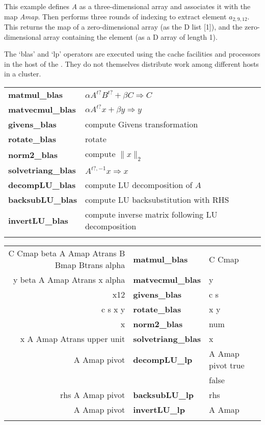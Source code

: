 \noindent This example defines \emph{A} as a three-dimensional array and associates it with the map \emph{Amap}. Then performs three rounds of indexing to extract element $a_{2,9,12}$. This returns the map of a zero-dimensional array (as the D list [1]), and the zero-dimensional array containing the element (as a D array of length 1).

The `blas' and `lp' operators are executed using the cache facilities and processors in the host of the . They do not themselves distribute work among different hosts in a cluster.\\

\begin{tabular}{>{\sffamily\bfseries}l>{\sffamily}l}
matmul\_blas & $\alpha A^{t?} B^{t?} + \beta C \Rightarrow C $ \\
matvecmul\_blas & $\alpha A^{t?} x + \beta y \Rightarrow y$ \\
givens\_blas & compute Givens transformation \\
rotate\_blas & rotate\\
norm2\_blas & compute $\lVert x \rVert _2$\\
solvetriang\_blas & $A^{t?,-1} x \Rightarrow x$\\
decompLU\_blas & compute LU decomposition of $A$\\
backsubLU\_blas & compute LU backsubstitution with RHS\\
invertLU\_blas & compute inverse matrix following LU decomposition\\\\
\end{tabular}

\begin{tabular}{>{\sffamily}r>{\sffamily\bfseries}l>{\sffamily}l}
C Cmap beta A Amap Atrans B Bmap Btrans alpha & matmul\_blas & C Cmap \\
y beta A Amap Atrans x alpha & matvecmul\_blas & y \\
x12 & givens\_blas & c s \\
c s x y & rotate\_blas & x y \\
x & norm2\_blas & num \\
x A Amap Atrans upper unit & solvetriang\_blas & x \\
A Amap pivot & decompLU\_lp & A Amap pivot true \\
                 &              & false\\
rhs A Amap pivot & backsubLU\_lp & rhs \\
A Amap pivot & invertLU\_lp & A Amap \\\\
\end{tabular}

